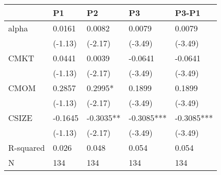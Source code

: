 \begin{tabular}{lllll}
\toprule
 & P1 & P2 & P3 & P3-P1 \\
\midrule
alpha & 0.0161 & 0.0082 & 0.0079 & 0.0079 \\
  & (-1.13) & (-2.17) & (-3.49) & (-3.49) \\
CMKT & 0.0441 & 0.0039 & -0.0641 & -0.0641 \\
  & (-1.13) & (-2.17) & (-3.49) & (-3.49) \\
CMOM & 0.2857 & 0.2995* & 0.1899 & 0.1899 \\
  & (-1.13) & (-2.17) & (-3.49) & (-3.49) \\
CSIZE & -0.1645 & -0.3035** & -0.3085*** & -0.3085*** \\
  & (-1.13) & (-2.17) & (-3.49) & (-3.49) \\
R-squared & 0.026 & 0.048 & 0.054 & 0.054 \\
N & 134 & 134 & 134 & 134 \\
\bottomrule
\end{tabular}
